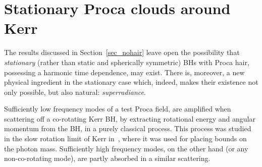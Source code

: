 %
%
%
%
%
%
%
%  
%

\section{Stationary Proca clouds around Kerr}
\label{sec_clouds}
The results discussed in Section~\ref{sec_nohair} leave open the possibility that \textit{stationary} (rather than static and spherically symmetric) BHs with Proca hair, possessing a harmonic time dependence, may exist. There is, moreover, a new physical ingredient in the stationary case which, indeed, makes their existence not only possible, but also natural: \textit{superradiance}. 

Sufficiently low frequency modes of a test Proca field, are amplified when scattering off a co-rotating Kerr BH, by extracting rotational energy and angular momentum from the BH, in a purely classical process. This process was studied in the slow rotation limit of Kerr in~\cite{Pani:2012vp,Pani:2012bp}, where it was used for placing bounds on the photon mass. Sufficiently high frequency modes, on the other hand (or any non-co-rotating mode), are partly absorbed in a similar scattering. 

